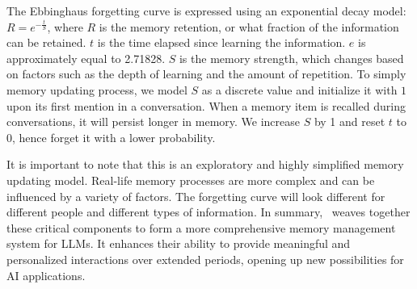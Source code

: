 The Ebbinghaus forgetting curve is expressed using an exponential decay model: $R = e^{-\frac{t}{S}}$, where $R$ is the memory retention, or what fraction of the information can be retained.
$t$ is the time elapsed since learning the information. $e$ is approximately equal to 2.71828. %
$S$ is the memory strength, which changes based on factors such as the depth of learning and the amount of repetition. To simply memory updating process, we model $S$ as a discrete value and initialize it with $1$ upon its first mention in a conversation. When a memory item is recalled during conversations, it will persist longer in memory. We increase $S$ by 1 and reset $t$ to 0, hence forget it with a lower probability. 

It is important to note that this is an exploratory and highly simplified memory updating model. Real-life memory processes are more complex and can be influenced by a variety of factors. The forgetting curve will look different for different people and different types of information. 
In summary, \method~weaves together these critical components to form a more comprehensive memory management system for LLMs. It enhances their ability to provide meaningful and personalized interactions over extended periods, opening up new possibilities for AI applications.




